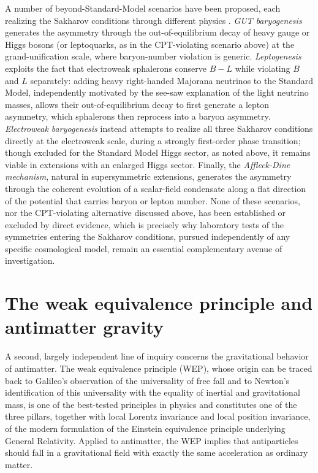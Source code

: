 A number of beyond-Standard-Model scenarios have been proposed, each realizing the Sakharov conditions through different physics \cite{RiottoTrodden1999,Dine_2003}. \emph{GUT baryogenesis} generates the asymmetry through the out-of-equilibrium decay of heavy gauge or Higgs bosons (or leptoquarks, as in the CPT-violating scenario above) at the grand-unification scale, where baryon-number violation is generic. \emph{Leptogenesis} exploits the fact that electroweak sphalerons conserve $B-L$ while violating $B$ and $L$ separately: adding heavy right-handed Majorana neutrinos to the Standard Model, independently motivated by the see-saw explanation of the light neutrino masses, allows their out-of-equilibrium decay to first generate a lepton asymmetry, which sphalerons then reprocess into a baryon asymmetry. \emph{Electroweak baryogenesis} instead attempts to realize all three Sakharov conditions directly at the electroweak scale, during a strongly first-order phase transition; though excluded for the Standard Model Higgs sector, as noted above, it remains viable in extensions with an enlarged Higgs sector. Finally, the \emph{Affleck-Dine mechanism}, natural in supersymmetric extensions, generates the asymmetry through the coherent evolution of a scalar-field condensate along a flat direction of the potential that carries baryon or lepton number. None of these scenarios, nor the CPT-violating alternative discussed above, has been established or excluded by direct evidence, which is precisely why laboratory tests of the symmetries entering the Sakharov conditions, pursued independently of any specific cosmological model, remain an essential complementary avenue of investigation.

\section{The weak equivalence principle and antimatter gravity}

A second, largely independent line of inquiry concerns the gravitational behavior of antimatter. The weak equivalence principle (WEP), whose origin can be traced back to Galileo's observation of the universality of free fall and to Newton's identification of this universality with the equality of inertial and gravitational mass, is one of the best-tested principles in physics and constitutes one of the three pillars, together with local Lorentz invariance and local position invariance, of the modern formulation of the Einstein equivalence principle underlying General Relativity. Applied to antimatter, the WEP implies that antiparticles should fall in a gravitational field with exactly the same acceleration as ordinary matter.

